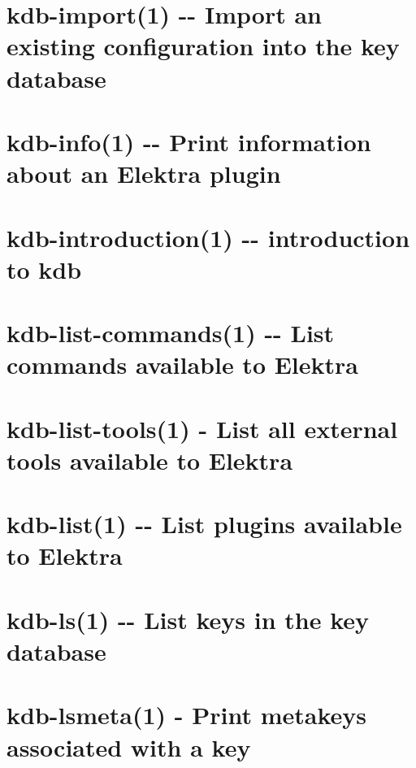 \documentclass[twoside]{book}
\newcommand{\+}{\discretionary{\mbox{\scriptsize$\hookleftarrow$}}{}{}}
\begin{document}
\chapter{kdb-\/import(1) -\/-\/ Import an existing configuration into the key database}
\label{md_doc_help_kdb-import}

\chapter{kdb-\/info(1) -\/-\/ Print information about an Elektra plugin}
\label{md_doc_help_kdb-info}

\chapter{kdb-\/introduction(1) -\/-\/ introduction to kdb}
\label{md_doc_help_kdb-introduction}

\chapter{kdb-\/list-\/commands(1) -\/-\/ List commands available to Elektra}
\label{md_doc_help_kdb-list-commands}

\chapter{kdb-\/list-\/tools(1) -\/ List all external tools available to Elektra}
\label{md_doc_help_kdb-list-tools}

\chapter{kdb-\/list(1) -\/-\/ List plugins available to Elektra}
\label{md_doc_help_kdb-list}

\chapter{kdb-\/ls(1) -\/-\/ List keys in the key database}
\label{md_doc_help_kdb-ls}

\chapter{kdb-\/lsmeta(1) -\/ Print metakeys associated with a key}
\label{md_doc_help_kdb-lsmeta}

\end{document}
